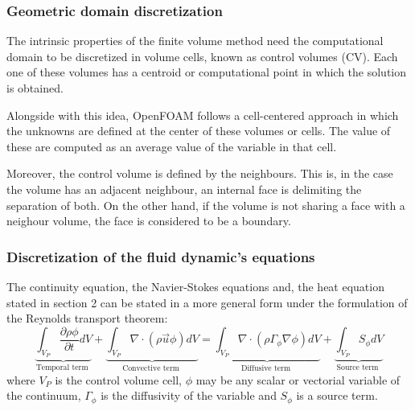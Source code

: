 \subsubsection*{Geometric domain discretization}

\setlength{\parindent}{0.5cm} The intrinsic properties of the finite volume method need the computational domain to be discretized in volume cells, known as control volumes (CV). Each one of these volumes has a centroid or computational point in which the solution is obtained. 

\noindent Alongside with this idea, OpenFOAM follows a cell-centered approach in which the unknowns are defined at the center of these volumes or cells. The value of these are computed as an average value of the variable in that cell.

\noindent Moreover, the control volume is defined by the neighbours. This is, in the case the volume has an adjacent neighbour, an internal face is delimiting the separation of both. On the other hand, if the volume is not sharing a face with a neighour volume, the face is considered to be a boundary.

\subsubsection*{Discretization of the fluid dynamic's equations}

\setlength{\parindent}{0.5cm} The continuity equation, the Navier-Stokes equations and, the heat equation stated in section 2 can be stated in a more general form under the formulation of the Reynolds transport theorem:
\begin{equation}
	\underbrace{\int_{V_{P}} \frac{\partial \rho \phi}{\partial t} d V}_{\text {Temporal term }}+\underbrace{\int_{V_{P}} \nabla \cdot(\rho \vec{u} \phi) d V}_{\text {Convective term }}=\underbrace{\int_{V_{P}} \nabla \cdot\left(\rho \Gamma_{\phi} \nabla \phi\right) d V}_{\text {Diffusive term }}+\underbrace{\int_{V_{P}} S_{\phi} d V}_{\text {Source term }}
	\label{3.1}
\end{equation}
where $V_{P}$ is the control volume cell, $\phi$ may be any scalar or vectorial variable of the continuum, $\Gamma_{\phi}$ is the diffusivity of the variable and $S_{\phi}$ is a source term. 

